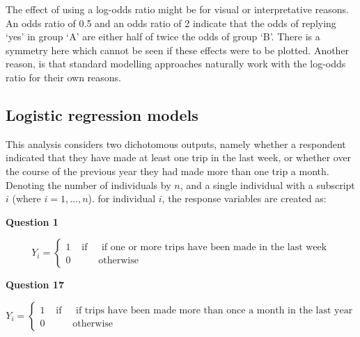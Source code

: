 The effect of using a log-odds ratio might be for visual or interpretative
reasons.   An odds ratio of 0.5 and an odds ratio of 2 indicate that the odds
of replying `yes' in group `A' are either half of twice the odds of group `B'.
There is a symmetry here which cannot be seen if these effects were to be
plotted.   Another reason, is that standard modelling approaches naturally
work with the log-odds ratio for their own reasons.

  



\subsection{Logistic regression models}

This analysis considers two dichotomous outputs, namely whether a respondent
indicated that they have made at least one trip in the last week, or whether
over the course of the previous year they had made more than one trip a
month.   Denoting the number of individuals by $n$, and a single
individual with a subscript $i$ (where $i = 1, \ldots, n$).
for individual $i$, the response variables are created as:

\textbf{Question 1}


\begin{displaymath}
Y_i = \left\{ \begin{array}{rll}
1 & \mbox{ if } &\mbox{ if one or more trips have been made in the last week}\\
0 & & \mbox{otherwise}
\end{array} \right.
\end{displaymath}

\textbf{Question 17}


\begin{displaymath}
Y_i = \left\{ \begin{array}{rll}
             1 & \mbox{ if } &\mbox{ if trips have been made more than
                                     once a month in the last year}\\
0 & & \mbox{otherwise}
\end{array} \right.
\end{displaymath}


